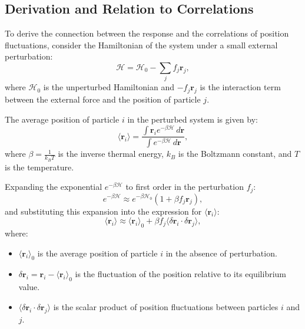 \documentclass[English, Lau, oneside]{sapthesis}
\begin{document}
\subsection*{Derivation and Relation to Correlations}

\noindent To derive the connection between the response and the correlations of position fluctuations, consider the Hamiltonian of the system under a small external perturbation:
\begin{equation}
\mathcal{H} = \mathcal{H}_0 - \sum_j f_j \mathbf{r}_j,
\end{equation}
where $\mathcal{H}_0$ is the unperturbed Hamiltonian and $-f_j \mathbf{r}_j$ is the interaction term between the external force and the position of particle $j$.

\noindent The average position of particle $i$ in the perturbed system is given by:
\begin{equation}
\langle \mathbf{r}_i \rangle = \frac{\int \mathbf{r}_i e^{-\beta \mathcal{H}} \, d\mathbf{r}}{\int e^{-\beta \mathcal{H}} \, d\mathbf{r}},
\end{equation}
where $\beta = \frac{1}{k_B T}$ is the inverse thermal energy, $k_B$ is the Boltzmann constant, and $T$ is the temperature.

\noindent Expanding the exponential $e^{-\beta \mathcal{H}}$ to first order in the perturbation $f_j$:
\begin{equation}
e^{-\beta \mathcal{H}} \approx e^{-\beta \mathcal{H}_0} \left( 1 + \beta f_j \mathbf{r}_j \right),
\end{equation}
and substituting this expansion into the expression for $\langle \mathbf{r}_i \rangle$:
\begin{equation}
\langle \mathbf{r}_i \rangle \approx \langle \mathbf{r}_i \rangle_0 + \beta f_j \langle \delta \mathbf{r}_i \cdot \delta \mathbf{r}_j \rangle,
\end{equation}
where:
\begin{itemize}
    \item $\langle \mathbf{r}_i \rangle_0$ is the average position of particle $i$ in the absence of perturbation.
    \item $\delta \mathbf{r}_i = \mathbf{r}_i - \langle \mathbf{r}_i \rangle_0$ is the fluctuation of the position relative to its equilibrium value.
    \item $\langle \delta \mathbf{r}_i \cdot \delta \mathbf{r}_j \rangle$ is the scalar product of position fluctuations between particles $i$ and $j$.
\end{itemize}
\end{document}
